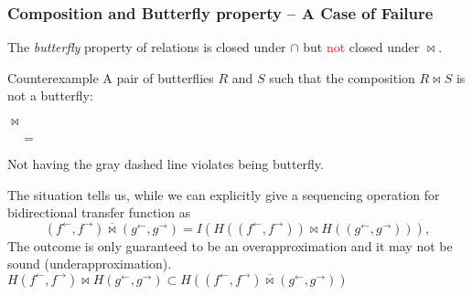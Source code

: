 \documentclass{beamer}
\newcommand{\ff}{{f^{\rightarrow}}}
\newcommand{\fb}{{f^{\leftarrow}}}
\newcommand{\gf}{{g^{\rightarrow}}}
\newcommand{\gb}{{g^{\leftarrow}}}
\newcommand{\bowtielift}{\mathbin{\overline{\bowtie}}}
\newcommand{\rotleq}{\rotatebox[origin=c]{90}{$\leq$}}
\newcommand{\red}[1]{\textcolor{red}{#1}}
\begin{document}
\begin{frame} [fragile]
  \frametitle{Composition and Butterfly property -- A Case of Failure}
  The \emph{butterfly} property of relations is closed under $\cap$ but \red{not} closed under $\bowtie$.
  \begin{block}{Counterexample}
  A pair of butterflies $R$ and $S$ such that the composition $R \bowtie S$ is not a butterfly:
  \begin{center}
    $\bowtie$
    $\quad=\quad$
  \end{center}
  Not having the gray dashed line violates being butterfly.
  \end{block}
\end{frame}

\begin{frame}
  The situation tells us, while we can explicitly give a sequencing operation for bidirectional transfer function as
  \begin{equation*}
    (\fb,\ff) \bowtielift (\gb,\gf) = I(H((\fb, \ff)) \bowtie H((\gb , \gf))),
  \end{equation*}
  The outcome is only guaranteed to be an overapproximation and it may not be sound (underapproximation).
  $H(\fb, \ff) \bowtie H(\gb, \gf) \subset H((\fb, \ff) \bowtielift (\gb, \gf))$
\end{frame}
\end{document}
